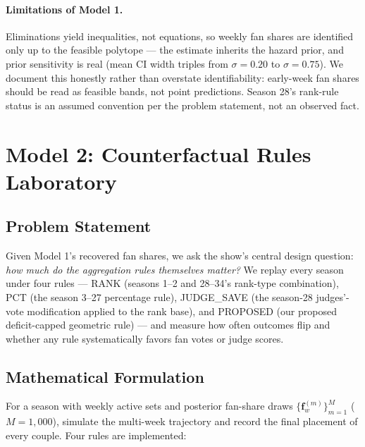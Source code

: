 \documentclass[11pt]{article}
\begin{document}
\paragraph{Limitations of Model 1.} Eliminations yield inequalities, not
equations, so weekly fan shares are identified only up to the feasible
polytope --- the estimate inherits the hazard prior, and prior sensitivity
is real (mean CI width triples from $\sigma = 0.20$ to $\sigma = 0.75$).
We document this honestly rather than overstate identifiability: early-week
fan shares should be read as feasible bands, not point predictions. Season
28's rank-rule status is an assumed convention per the problem statement,
not an observed fact.

\section{Model 2: Counterfactual Rules Laboratory}
\label{sec:model2}

\subsection{Problem Statement}

Given Model 1's recovered fan shares, we ask the show's central design
question: \emph{how much do the aggregation rules themselves matter?}
We replay every season under four rules --- RANK (seasons 1--2 and
28--34's rank-type combination), PCT (the season 3--27 percentage rule),
JUDGE\_SAVE (the season-28 judges'-vote modification applied to the rank
base), and PROPOSED (our proposed deficit-capped geometric rule) --- and
measure how often outcomes flip and whether any rule systematically
favors fan votes or judge scores.

\subsection{Mathematical Formulation}

For a season with weekly active sets and posterior fan-share draws
$\{\mathbf{f}^{(m)}_w\}_{m=1}^{M}$ ($M=1{,}000$), simulate the
multi-week trajectory and record the final placement of every couple.
Four rules are implemented:
\end{document}
